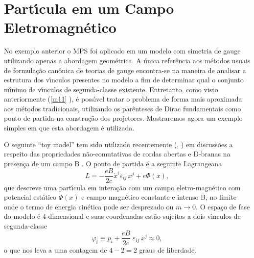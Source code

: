 \documentclass[a4paper,thmsa,12pt]{report}
\begin{document}
\section{{\sc Part\'{\i}cula em um Campo Eletromagn\'etico}}

No exemplo anterior o MPS foi aplicado em um modelo com simetria de gauge
utilizando apenas a abordagem geom\'{e}trica. A \'{u}nica refer\^{e}ncia aos
m\'{e}todos usuais de formula\c{c}\~{a}o can\^{o}nica de teorias de gauge
encontra-se na maneira de analisar a estrutura dos v\'{\i}nculos presentes
no modelo a fim de determinar qual o conjunto m\'{\i}nimo de v\'{\i}nculos
de segunda-classe existente. Entretanto, como visto anteriormente (\ref{m11}%
), \'{e} poss\'{\i}vel tratar o problema de forma mais aproximada aos
m\'{e}todos tradicionais, utilizando os par\^{e}nteses de Dirac fundamentais
como ponto de partida na constru\c{c}\~{a}o dos projetores. Mostraremos
agora um exemplo simples em que esta abordagem \'{e} utilizada.

O seguinte ``toy model'' tem sido utilizado recentemente (\cite{bigatti}, 
\cite{kim}) em discuss\~{o}es a respeito das propriedades
n\~{a}o-comutativas de cordas abertas e D-branas na presen\c{c}a de um campo
B \cite{mmi}. O ponto de partida \'{e} a seguinte Lagrangeana 
\begin{equation}
L=-\frac{eB}{2c}\dot{x}^{i}\varepsilon _{ij}\,x^{j}+e\Phi (x),  \label{2.13}
\end{equation}
que descreve uma part\'{\i}cula em intera\c{c}\~{a}o com um campo
eletro-magn\'{e}tico com potencial est\'{a}tico $\Phi (x)$ e campo
magn\'{e}tico constante e intenso B, no limite onde o termo de energia
cin\'{e}tica pode ser desprezado ou $m\rightarrow 0$. O espa\c{c}o de fase
do modelo \'{e} 4-dimensional e suas coordenadas est\~{a}o sujeitas a dois
v\'{\i}nculos de segunda-classe 
\begin{equation}
\varphi _{i}\equiv p_{i}+\frac{eB}{2c}\;\varepsilon _{ij}\,x^{j}\approx 0,
\label{2.14}
\end{equation}
o que nos leva a uma contagem de $4-2=2$ graus de liberdade.
\end{document}
